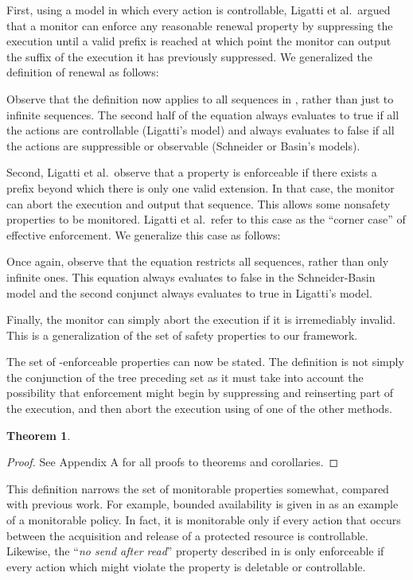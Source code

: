 \documentclass[12pt]{article}
\newtheorem{thm}{Theorem}
\begin{document}
First, using a model in which every action is controllable, Ligatti et al.\ argued that a monitor can enforce any reasonable renewal property by suppressing the execution until a valid prefix is reached at which point the monitor can output the suffix of the execution it has previously suppressed.  We generalized the definition of renewal as follows:


Observe that the definition now applies to all sequences in , rather than just to infinite sequences. The second half of the equation always evaluates to true if all the actions are controllable (Ligatti's model) and always evaluates to false if all the actions are suppressible or observable (Schneider or Basin's models).

Second, Ligatti et al.\ observe that a property is enforceable if there exists a prefix beyond which there is only one valid extension. In that case, the monitor can abort the execution and output that sequence. This allows some nonsafety properties to be monitored. Ligatti et al.\ refer to this case as the ``corner case'' of effective enforcement.  We generalize this case as follows:


Once again, observe that the equation restricts all sequences, rather than only infinite ones. This equation always evaluates to false in the Schneider-Basin model and the second conjunct always evaluates to true in Ligatti's model.

Finally, the monitor can simply abort the execution if it is irremediably invalid. This is a generalization of the set of safety properties to our framework.


The set of -enforceable properties  can now be stated. The definition is not simply the conjunction of the tree preceding set as it must take into account the possibility that enforcement might begin by suppressing and reinserting part of the execution, and then abort the execution using of one of the other methods.
\begin{thm}\label{thm:Master}

\end{thm}
\begin{proof}
See Appendix A for all proofs to theorems and corollaries.
\end{proof}

This definition narrows the set of monitorable properties somewhat, compared with previous work. For example, bounded availability is given in \cite{nonsafetyJournal} as an example of a monitorable policy. In fact, it is monitorable only if every action  that occurs between the acquisition and release of a protected resource is controllable. Likewise, the ``\textit{no send after read}'' property described in \cite{enforceable} is only enforceable if every action which might violate the property is deletable or controllable.
\end{document}
